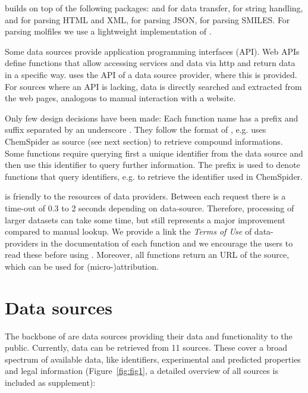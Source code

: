 \documentclass[article, shortnames]{jss}\usepackage[]{graphicx}\usepackage[]{color}
\begin{document}
 builds on top of the following  packages:
 \citep{lang_rcurl:_2015} and  \citep{wickham_httr} for data transfer,
 \cite{wickham_stringr:_2015} for string handling,
 \citep{wickham_xml2} and  \citep{wickham_rvest} for parsing HTML and XML,
 \citep{ooms_jsonlite_2014} for parsing JSON,
 \citep{guha_rcdk} for parsing SMILES.
For parsing molfiles we use a lightweight implementation of \citep{Grabner_Varmuza_Dehmer_2012}.

Some data sources provide application programming interfaces (API).
Web APIs define  functions that allow accessing services and data via http and return data in a specific way.
 uses the API of a data source provider, where this is provided.
For sources where an API is lacking, data is directly searched and extracted from the web pages, analogous to manual interaction with a website.

Only few design decisions have been made:
Each function name has a prefix and suffix separated by an underscore \citep{Chamberlain_Szocs_2013}.
They follow the format of , e.g.  uses ChemSpider as source (see next section) to retrieve compound informations.
Some functions require querying first a unique identifier from the data source and then use this identifier to query further information.
The prefix  is used to denote functions that query identifiers, e.g.  to retrieve the identifier used in ChemSpider.

 is friendly to the resources of data providers. 
Between each request there is a time-out of 0.3 to 2 seconds depending on data-source. 
Therefore, processing of larger datasets can take some time, but still represents a major improvement compared to manual lookup.
We provide a link the \emph{Terms of Use} of data-providers in the documentation of each function and we encourage the users to read these before using .
Moreover, all functions return an URL of the source, which can be used for \mbox{(micro-)attribution}.


\section[Data sources]{Data sources}
The backbone of  are data sources providing their data and functionality to the public.
Currently, data can be retrieved from 11 sources.
These cover a broad spectrum of available data, like identifiers, experimental and predicted properties and legal information (Figure~\ref{fig:fig1}, a detailed overview of all sources is included as supplement):
\end{document}
